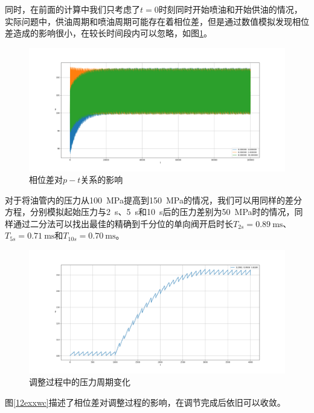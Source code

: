 \documentclass[12pt,AutoFakeBold]{article}%
\begin{document}
    同时，在前面的计算中我们只考虑了$t=0$时刻同时开始喷油和开始供油的情况，实际问题中，供油周期和喷油周期可能存在着相位差，但是通过数值模拟发现相位差造成的影响很小，在较长时间段内可以忽略，如图\ref{11exxwc}。\par
    \begin{figure}[H]
        \centering
        \includegraphics[scale=0.32]{figure/11-exxwc.png}
        \caption{相位差对$p-t$关系的影响}
        \label{11exxwc}
    \end{figure}
    对于将油管内的压力从\SI{100}{\MPa}提高到\SI{150}{\MPa}的情况，我们可以用同样的差分方程，分别模拟起始压力与\SI{2}{\s}、\SI{5}{\s}和\SI{10}{\s}后的压力差别为\SI{50}{\MPa}时的情况，同样通过二分法可以找出最佳的精确到千分位的单向阀开启时长$T_{2s}=\SI{0.89}{\ms}$、$T_{5s}=\SI{0.71}{\ms}$和$T_{10s}=\SI{0.70}{\ms}$。\par
    \begin{figure}[H]
        \centering
        \includegraphics[scale=0.32]{figure/13-1-t.png}
        \caption{调整过程中的压力周期变化}
        \label{adjustpress}
    \end{figure}
    图\ref{12exxwc}描述了相位差对调整过程的影响，在调节完成后依旧可以收敛。\par
\end{document}
